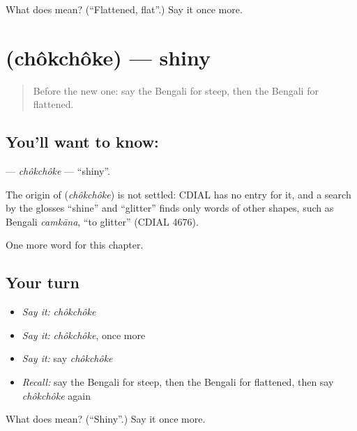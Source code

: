 \begin{tcolorbox}[breakable,colback=teal!4,colframe=teal!35!black,title={Before you move on}]
What does  mean? (\textquotedblleft{}Flattened, flat\textquotedblright{}.) Say it once more.
\end{tcolorbox}
\section[\texorpdfstring{\bn{চকচকে} (chôkchôke)}{চকচকে (chôkchôke)}]{ (chôkchôke) — shiny}

\label{lesson:BN-C247-chokchoke}



\begin{quote}
Before the new one: say the Bengali for steep, then the Bengali for flattened.
\end{quote}

\subsection*{You'll want to know: }
\textbf{} — \emph{chôkchôke} — \textquotedblleft{}shiny\textquotedblright{}.

\begin{cousinweb}
The origin of \textbf{} (\emph{chôkchôke}) is not settled: CDIAL has no entry for it, and a search by the glosses \textquotedblleft{}shine\textquotedblright{} and \textquotedblleft{}glitter\textquotedblright{} finds only words of other shapes, such as Bengali \emph{camkāna}, \textquotedblleft{}to glitter\textquotedblright{} (CDIAL 4676).
\end{cousinweb}

\begin{grammarlens}[title={What you've built}]
One more word for this chapter.
\end{grammarlens}

\subsection*{Your turn}
\begin{itemize}
\raggedright
  \item \emph{Say it:} \emph{chôkchôke}
  \item \emph{Say it:} \emph{chôkchôke}, once more
  \item \emph{Say it:} say \emph{chôkchôke}
  \item \emph{Recall:} say the Bengali for steep, then the Bengali for flattened, then say \emph{chôkchôke} again
\end{itemize}

\begin{tcolorbox}[breakable,colback=teal!4,colframe=teal!35!black,title={Before you move on}]
What does  mean? (\textquotedblleft{}Shiny\textquotedblright{}.) Say it once more.
\end{tcolorbox}
